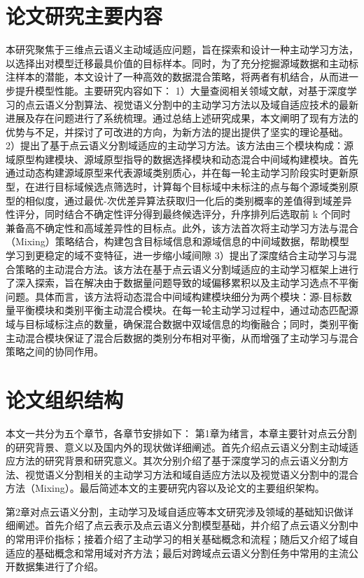 \section{论文研究主要内容}
本研究聚焦于三维点云语义主动域适应问题，旨在探索和设计一种主动学习方法，以选择出对模型迁移最具价值的目标样本。同时，为了充分挖掘源域数据和主动标注样本的潜能，本文设计了一种高效的数据混合策略，将两者有机结合，从而进一步提升模型性能。主要研究内容如下：
1）大量查阅相关领域文献，对基于深度学习的点云语义分割算法、视觉语义分割中的主动学习方法以及域自适应技术的最新进展及存在问题进行了系统梳理。通过总结上述研究成果，本文阐明了现有方法的优势与不足，并探讨了可改进的方向，为新方法的提出提供了坚实的理论基础。
2）提出了基于点云语义分割域适应的主动学习方法。该方法由三个模块构成：源域原型构建模块、源域原型指导的数据选择模块和动态混合中间域构建模块。首先通过动态构建源域原型来代表源域类别质心，并在每一轮主动学习阶段实时更新原型，在进行目标域候选点筛选时，计算每个目标域中未标注的点与每个源域类别原型的相似度，通过最优-次优差异算法获取归一化后的类别概率的差值得到域差异性评分，同时结合不确定性评分得到最终候选评分，升序排列后选取前 k 个同时兼备高不确定性和高域差异性的目标点。此外，该方法首次将主动学习方法与混合（Mixing）策略结合，构建包含目标域信息和源域信息的中间域数据，帮助模型学习到更稳定的域不变特征，进一步缩小域间隙
3）提出了深度结合主动学习与混合策略的主动混合方法。该方法在基于点云语义分割域适应的主动学习框架上进行了深入探索，旨在解决由于数据量问题导致的域偏移累积以及主动学习选点不平衡问题。具体而言，该方法将动态混合中间域构建模块细分为两个模块：源-目标数量平衡模块和类别平衡主动混合模块。在每一轮主动学习过程中，通过动态匹配源域与目标域标注点的数量，确保混合数据中双域信息的均衡融合；同时，类别平衡主动混合模块保证了混合后数据的类别分布相对平衡，从而增强了主动学习与混合策略之间的协同作用。

\section{论文组织结构}
本文一共分为五个章节，各章节安排如下：
第1章为绪言，本章主要针对点云分割的研究背景、意义以及国内外的现状做详细阐述。首先介绍点云语义分割主动域适应方法的研究背景和研究意义。其次分别介绍了基于深度学习的点云语义分割方法、视觉语义分割相关的主动学习方法和域自适应方法以及视觉语义分割中的混合方法（Mixing）。最后简述本文的主要研究内容以及论文的主要组织架构。

第2章对点云语义分割，主动学习及域自适应等本文研究涉及领域的基础知识做详细阐述。首先介绍了点云表示及点云语义分割模型基础，并介绍了点云语义分割中的常用评价指标；接着介绍了主动学习的相关基础概念和流程；随后又介绍了域自适应的基础概念和常用域对齐方法；最后对跨域点云语义分割任务中常用的主流公开数据集进行了介绍。

